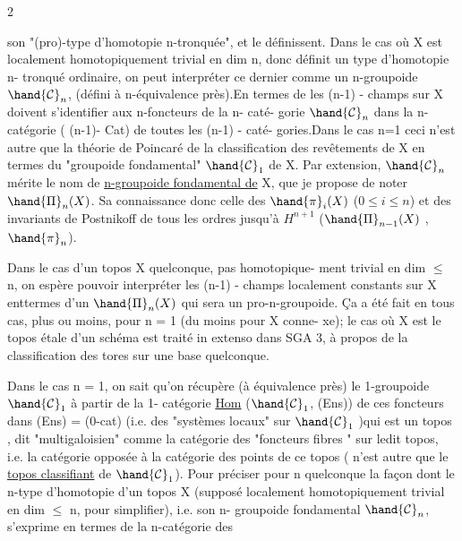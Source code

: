  \hfill 2

son "(pro)-type d'homotopie n-tronquée", et le définissent.  Dans le  cas
où  X est localement homotopiquement trivial en dim \hand{$\leq$} n, donc définit un
type d'homotopie  n- tronqué ordinaire, on peut interpréter ce dernier comme
 un n-groupoide  $\hand{\mathcal{C}}_{n}$, (défini à n-équivalence près).\hand{$\|$}En termes de \hand{,}
les (n-1) - champs  sur X doivent s'identifier aux n-foncteurs de la n- caté-%
gorie  $\hand{\mathcal{C}}_{n}$  dans  la n-catégorie   ( (n-1)- Cat)  de toutes les (n-1) - caté-%
gories.\hand{$\|$}Dans le cas n=1  ceci n'est autre que la théorie  de Poincaré  de la
classification des revêtements de X en termes du "groupoide fondamental" $\hand{\mathcal{C}}_{1}$
de X.  Par extension, $\hand{\mathcal{C}}_{n}$  mérite le nom de  \uline{n-groupoide fondamental  de}
X, que je propose de noter $\hand{\Pi}_{n}(X)$.  Sa connaissance  donc celle
des  $\hand{\pi}_{i}(X)$  ($0 \leq i \leq n$)  et des invariants de Postnikoff  de tous les
ordres jusqu'à  $H^{n+1}$  ($\hand{\Pi}_{n-1}(X)$ , $\hand{\pi}_{n}$).

Dans le cas d'un topos X quelconque, pas   homotopique-%
ment trivial en dim $\leq$ n,  on espère pouvoir interpréter les (n-1) - champs
localement constants sur X   enttermes d'un $\hand{\Pi}_{n}(X)$  qui sera un  pro-n-groupoide.
Ça  a été fait en tous cas, plus ou moins, pour n = 1  (du moins pour X conne-%
xe);  le cas où  X est le topos étale d'un schéma  est traité  in extenso
dans SGA 3, à propos de la classification des tores sur une base quelconque.

Dans le cas n = 1,  on sait qu'on récupère (à équivalence près)   le
1-groupoide  $\hand{\mathcal{C}}_{1}$  à partir de la 1- catégorie  \uline{Hom} ($\hand{\mathcal{C}}_{1}$, (Ens))  de ces
foncteurs  dans (Ens) = (0-cat) (i.e. des "systèmes locaux" sur $\hand{\mathcal{C}}_{1}$ )\hand{(}qui est
un  topos , dit "multigaloisien"\hand{)}\deleted{\unsure{,}}  comme la catégorie des "foncteurs fibres "
sur ledit topos, i.e. la catégorie opposée à la catégorie des points de ce
topos ( n'est autre que le  \uline{topos classifiant}  de $\hand{\mathcal{C}}_{1}$). Pour préciser
pour n quelconque la façon dont le n-type d'homotopie d'un topos X (supposé
localement homotopiquement trivial en dim $\leq$ n, pour simplifier), i.e.  son
n- groupoide fondamental $\hand{\mathcal{C}}_{n}$,  s'exprime en termes de la  n-catégorie des

